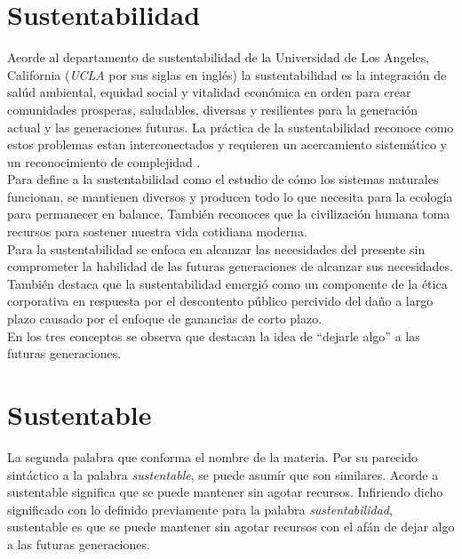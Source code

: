 \documentclass[letterpaper, 12pt]{article}
\begin{document}
    \section*{\centering Sustentabilidad}
    Acorde al departamento de sustentabilidad de la Universidad de Los Angeles, California (\emph{UCLA} por sus siglas en inglés) la sustentabilidad es la integración de salúd ambiental, equidad social y vitalidad económica en orden para crear comunidades prosperas, saludables, diversas y resilientes para
    la generación actual y las generaciones futuras. La práctica de la sustentabilidad reconoce como estos problemas estan interconectados y requieren un acercamiento sistemático y un reconocimiento de complejidad \cite{unknown-author-no-dateA}.
    \\\newline
    \noindent Para \cite{mason-no-date}
    define a la sustentabilidad como el estudio de cómo los sistemas naturales funcionan, se mantienen diversos y producen todo lo que necesita para la ecología para permanecer en balance. También reconoces que la civilización humana toma recursos
    para sostener nuestra vida cotidiana moderna.
    \\\newline
    \noindent Para \cite{grant-no-date}
    la sustentabilidad se enfoca en alcanzar las necesidades del presente sin comprometer la habilidad de las futuras generaciones de alcanzar sus necesidades. También destaca que la sustentabilidad emergió como un componente de la ética corporativa en respuesta por el descontento público percivido del
    daño a largo plazo causado por el enfoque de ganancias de corto plazo.
    \\\newline
    \noindent En los tres conceptos se observa que destacan la idea de ``dejarle algo'' a las futuras generaciones.
    \section*{\centering Sustentable}
    La segunda palabra que conforma el nombre de la materia. Por su parecido sintáctico a la palabra \emph{sustentable}, se puede asumír que son similares.
    Acorde a \cite{-asale-no-dateB}
    sustentable significa que se puede mantener sin agotar recursos. Infiriendo dicho significado con lo definido previamente para la palabra \emph{sustentabilidad}, sustentable es que se puede mantener sin agotar recursos con el afán de dejar algo a las futuras generaciones. \par
\end{document}
